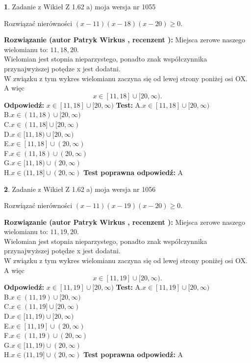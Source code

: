 \documentclass[12pt, a4paper]{article}
\theoremstyle{definition} %
\newtheorem{zad}{}
\newcommand{\zadStart}[1]{\begin{zad}#1\newline}
\newcommand{\zadStop}{\end{zad}}
\newcommand{\rozwStart}[2]{\noindent \textbf{Rozwiązanie (autor #1 , recenzent #2): }\newline}
\newcommand{\rozwStop}{\newline}
\newcommand{\odpStart}{\noindent \textbf{Odpowiedź:}\newline}
\newcommand{\odpStop}{\newline}
\newcommand{\testStart}{\noindent \textbf{Test:}\newline}
\newcommand{\testStop}{\newline}
\newcommand{\kluczStart}{\noindent \textbf{Test poprawna odpowiedź:}\newline}
\newcommand{\kluczStop}{\newline}
\begin{document}
\zadStart{Zadanie z Wikieł Z 1.62 a) moja wersja nr 1055}

Rozwiązać nierówności $(x-11)(x-18)(x-20)\ge0$.
\zadStop
\rozwStart{Patryk Wirkus}{}
Miejsca zerowe naszego wielomianu to: $11, 18, 20$.\\
Wielomian jest stopnia nieparzystego, ponadto znak współczynnika przy\linebreak najwyższej potędze x jest dodatni.\\ W związku z tym wykres wielomianu zaczyna się od lewej strony poniżej osi OX. A więc $$x \in [11,18] \cup [20,\infty).$$
\rozwStop
\odpStart
$x \in [11,18] \cup [20,\infty)$
\odpStop
\testStart
A.$x \in [11,18] \cup [20,\infty)$\\
B.$x \in (11,18) \cup [20,\infty)$\\
C.$x \in (11,18] \cup [20,\infty)$\\
D.$x \in [11,18) \cup [20,\infty)$\\
E.$x \in [11,18] \cup (20,\infty)$\\
F.$x \in (11,18) \cup (20,\infty)$\\
G.$x \in [11,18) \cup (20,\infty)$\\
H.$x \in (11,18] \cup (20,\infty)$
\testStop
\kluczStart
A
\kluczStop



\zadStart{Zadanie z Wikieł Z 1.62 a) moja wersja nr 1056}

Rozwiązać nierówności $(x-11)(x-19)(x-20)\ge0$.
\zadStop
\rozwStart{Patryk Wirkus}{}
Miejsca zerowe naszego wielomianu to: $11, 19, 20$.\\
Wielomian jest stopnia nieparzystego, ponadto znak współczynnika przy\linebreak najwyższej potędze x jest dodatni.\\ W związku z tym wykres wielomianu zaczyna się od lewej strony poniżej osi OX. A więc $$x \in [11,19] \cup [20,\infty).$$
\rozwStop
\odpStart
$x \in [11,19] \cup [20,\infty)$
\odpStop
\testStart
A.$x \in [11,19] \cup [20,\infty)$\\
B.$x \in (11,19) \cup [20,\infty)$\\
C.$x \in (11,19] \cup [20,\infty)$\\
D.$x \in [11,19) \cup [20,\infty)$\\
E.$x \in [11,19] \cup (20,\infty)$\\
F.$x \in (11,19) \cup (20,\infty)$\\
G.$x \in [11,19) \cup (20,\infty)$\\
H.$x \in (11,19] \cup (20,\infty)$
\testStop
\kluczStart
A
\kluczStop
\end{document}
